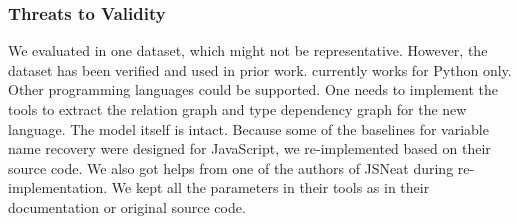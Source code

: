 \subsubsection{Threats to Validity}
\label{sec:threats}

We evaluated in one dataset, which might not be
representative. However, the dataset has been verified and used in
prior work. {\tool} currently works for Python only. Other programming
languages could be supported. One needs to implement the tools to
extract the relation graph and type dependency graph for the new
language. The model itself is intact. Because some of the baselines
for variable name recovery were designed for JavaScript, we
re-implemented based on their source code. We also got helps from one
of the authors of JSNeat during re-implementation. We kept all the
parameters in their tools as in their documentation or original source code.

